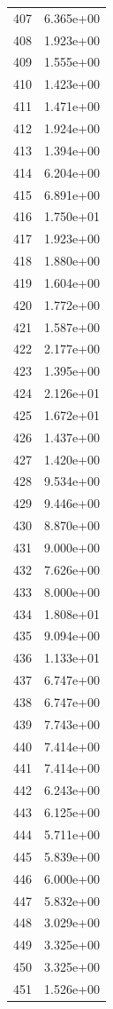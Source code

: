 \documentclass[12pt]{article}
\begin{document}
\begin{longtable}{@{}cc@{}}
407 & 6.365e+00 \\
408 & 1.923e+00 \\
409 & 1.555e+00 \\
410 & 1.423e+00 \\
411 & 1.471e+00 \\
412 & 1.924e+00 \\
413 & 1.394e+00 \\
414 & 6.204e+00 \\
415 & 6.891e+00 \\
416 & 1.750e+01 \\
417 & 1.923e+00 \\
418 & 1.880e+00 \\
419 & 1.604e+00 \\
420 & 1.772e+00 \\
421 & 1.587e+00 \\
422 & 2.177e+00 \\
423 & 1.395e+00 \\
424 & 2.126e+01 \\
425 & 1.672e+01 \\
426 & 1.437e+00 \\
427 & 1.420e+00 \\
428 & 9.534e+00 \\
429 & 9.446e+00 \\
430 & 8.870e+00 \\
431 & 9.000e+00 \\
432 & 7.626e+00 \\
433 & 8.000e+00 \\
434 & 1.808e+01 \\
435 & 9.094e+00 \\
436 & 1.133e+01 \\
437 & 6.747e+00 \\
438 & 6.747e+00 \\
439 & 7.743e+00 \\
440 & 7.414e+00 \\
441 & 7.414e+00 \\
442 & 6.243e+00 \\
443 & 6.125e+00 \\
444 & 5.711e+00 \\
445 & 5.839e+00 \\
446 & 6.000e+00 \\
447 & 5.832e+00 \\
448 & 3.029e+00 \\
449 & 3.325e+00 \\
450 & 3.325e+00 \\
451 & 1.526e+00 \\

\end{longtable}
\end{document}
